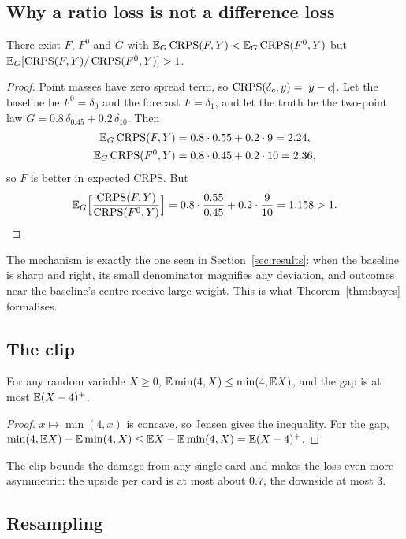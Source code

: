 \subsection{Why a ratio loss is not a difference loss}

\begin{proposition}\label{prop:counter}
There exist $F$, $F^0$ and $G$ with $\mathbb{E}_G\operatorname{CRPS}(F,Y)<\mathbb{E}_G\operatorname{CRPS}(F^0,Y)$ but $\mathbb{E}_G[\operatorname{CRPS}(F,Y)/\operatorname{CRPS}(F^0,Y)]>1$.
\end{proposition}
\begin{proof}
Point masses have zero spread term, so $\operatorname{CRPS}(\delta_c,y)=|y-c|$. Let the baseline be $F^0=\delta_0$ and the forecast $F=\delta_1$, and let the
truth be the two-point law $G=0.8\,\delta_{0.45}+0.2\,\delta_{10}$. Then
\begin{align*}
  \mathbb{E}_G\operatorname{CRPS}(F,Y)&=0.8\cdot0.55+0.2\cdot9=2.24,\\
  \mathbb{E}_G\operatorname{CRPS}(F^0,Y)&=0.8\cdot0.45+0.2\cdot10=2.36,
\end{align*}
so $F$ is better in expected CRPS. But
\begin{equation*}
  \mathbb{E}_G\Bigl[\frac{\operatorname{CRPS}(F,Y)}{\operatorname{CRPS}(F^0,Y)}\Bigr]=0.8\cdot\frac{0.55}{0.45}+0.2\cdot\frac{9}{10}=1.158>1 .
\end{equation*}
\end{proof}
The mechanism is exactly the one seen in Section~\ref{sec:results}: when the baseline is sharp and right, its small denominator magnifies any
deviation, and outcomes near the baseline's centre receive large weight. This is what Theorem~\ref{thm:bayes} formalises.

\subsection{The clip}

\begin{lemma}
For any random variable $X\ge0$, $\mathbb{E}\min(4,X)\le\min(4,\mathbb{E} X)$, and the gap is at most $\mathbb{E}(X-4)^+$.
\end{lemma}
\begin{proof}
$x\mapsto\min(4,x)$ is concave, so Jensen gives the inequality. For the gap, $\min(4,\mathbb{E} X)-\mathbb{E}\min(4,X)\le\mathbb{E} X-\mathbb{E}\min(4,X)=\mathbb{E}(X-4)^+$.
\end{proof}
The clip bounds the damage from any single card and makes the loss even more asymmetric: the upside per card is at most about $0.7$, the downside at
most $3$.

\subsection{Resampling}

